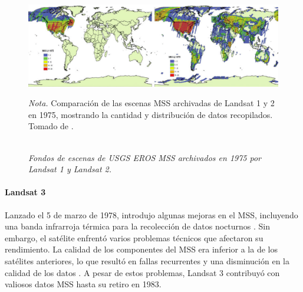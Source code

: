                     \begin{figure}[H] 
                        \caption{\doublespacing \\ \textit{Fondos de escenas de USGS EROS MSS archivados en 1975 por Landsat 1 y Landsat 2.}} 
                        \centering
                        \includegraphics[width=1\linewidth]{2_CAPITULO2/IMG/landsat2.png}
                        \begin{justify}
                            \textit{Nota.} Comparación de las escenas MSS archivadas de Landsat 1 y 2 en 1975, mostrando la cantidad y distribución de datos recopilados. Tomado de \textcite{landsat_legacy}.
                        \end{justify}                    
                        \label{landsat2}
                    \end{figure}

                \paragraph{Landsat 3}
                    Lanzado el 5 de marzo de 1978, introdujo algunas mejoras en el MSS, incluyendo una banda infrarroja térmica para la recolección de datos nocturnos . Sin embargo, el satélite enfrentó varios problemas técnicos que afectaron su rendimiento. La calidad de los componentes del MSS era inferior a la de los satélites anteriores, lo que resultó en fallas recurrentes y una disminución en la calidad de los datos . A pesar de estos problemas, Landsat 3 contribuyó con valiosos datos MSS hasta su retiro en 1983.
                    
